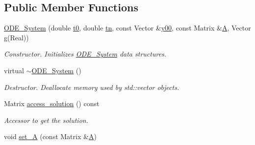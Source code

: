 \subsection*{Public Member Functions}
\begin{DoxyCompactItemize}
\item 
\mbox{\label{class_o_d_e___system_a39f84fa09d28b6ecf4de1e57b480a568}} 
\mbox{\hyperlink{class_o_d_e___system_a39f84fa09d28b6ecf4de1e57b480a568}{O\+D\+E\+\_\+\+System}} (double \mbox{\hyperlink{class_o_d_e___system_a1947b357608babc98c5e79d645e24c3c}{t0}}, double \mbox{\hyperlink{class_o_d_e___system_a5c5a0dd9f04dfb8d8a84d49b741773af}{tn}}, const Vector \&\mbox{\hyperlink{class_o_d_e___system_a1379137a4480e5861fd1911bc061f908}{y00}}, const Matrix \&\mbox{\hyperlink{class_o_d_e___system_a632009677e80b62a1996e842398bf8b6}{A}}, Vector \mbox{\hyperlink{class_o_d_e___system_a2dee2a4b3468547c3ddab15edfc8ddfd}{g}}(Real))
\begin{DoxyCompactList}\small\item\em Constructor. Initializes \mbox{\hyperlink{class_o_d_e___system}{O\+D\+E\+\_\+\+System}} data structures. \end{DoxyCompactList}\item 
\mbox{\label{class_o_d_e___system_a1d38890ff0950344d4d34b9fab6a956b}} 
virtual \mbox{\hyperlink{class_o_d_e___system_a1d38890ff0950344d4d34b9fab6a956b}{$\sim$\+O\+D\+E\+\_\+\+System}} ()
\begin{DoxyCompactList}\small\item\em Destructor. Deallocate memory used by std\+::vector objects. \end{DoxyCompactList}\item 
\mbox{\label{class_o_d_e___system_aebb5a7971ef1c429077155eec549f713}} 
Matrix \mbox{\hyperlink{class_o_d_e___system_aebb5a7971ef1c429077155eec549f713}{access\+\_\+solution}} () const
\begin{DoxyCompactList}\small\item\em Accessor to get the solution. \end{DoxyCompactList}\item 
\mbox{\label{class_o_d_e___system_a24094974423d600f580455427141fa3e}} 
void \mbox{\hyperlink{class_o_d_e___system_a24094974423d600f580455427141fa3e}{set\+\_\+A}} (const Matrix \&\mbox{\hyperlink{class_o_d_e___system_a632009677e80b62a1996e842398bf8b6}{A}})

\end{DoxyCompactItemize}
